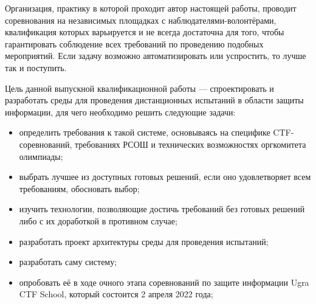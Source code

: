 Организация, практику в которой проходит автор настоящей работы, проводит соревнования на независимых площадках с наблюдателями-волонтёрами, квалификация которых варьируется и не всегда достаточна для того, чтобы гарантировать соблюдение всех требований по проведению подобных мероприятий. Если задачу возможно автоматизировать или успростить, то лучше так и поступить.

Цель данной выпускной квалификационной работы --- спроектировать и разработать среды для проведения дистанционных испытаний в области защиты информации, для чего необходимо решить следующие задачи:
\begin{itemize}
\item определить требования к такой системе, основываясь на специфике CTF-соревнований, требованиях РСОШ и технических возможностях оргкомитета олимпиады;
\item выбрать лучшее из доступных готовых решений, если оно удовлетворяет всем требованиям, обосновать выбор;
\item изучить технологии, позволяющие достичь требований без готовых решений либо с их доработкой в противном случае;
\item разработать проект архитектуры среды для проведения испытаний;
\item разработать саму систему;
\item опробовать её в ходе очного этапа соревнований по защите информации Ugra CTF School, который состоится 2 апреля 2022 года;
\end{itemize}
